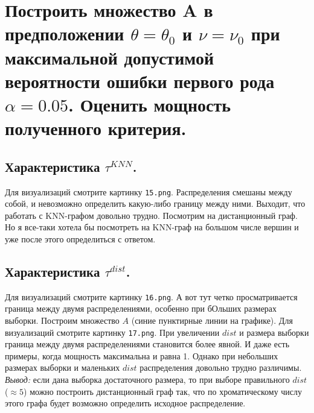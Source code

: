 \documentclass{report}
\begin{document}
\chapter{Построить множество A в предположении $\theta = \theta_0$ и $\nu = \nu_0$ при максимальной допустимой вероятности ошибки первого рода $\alpha = 0.05$. Оценить мощность полученного критерия.}
\section{Характеристика $\tau^{KNN}$.}
Для визуализаций смотрите картинку \texttt{15.png}.
\newline
\newline
Распределения смешаны между собой, и невозможно определить какую-либо границу между ними. Выходит, что работать с KNN-графом довольно трудно. Посмотрим на дистанционный граф. 
\newline
\newline
Но я все-таки хотела бы посмотреть на KNN-граф на большом числе вершин и уже после этого определиться с ответом.

\section{Характеристика $\tau^{dist}$.}
Для визуализаций смотрите картинку \texttt{16.png}.
\newline
\newline
А вот тут четко просматривается граница между двумя распределениями, особенно при бОльших размерах выборки. Построим множество $A$ (синие пунктирные линии на графике).
\newline
\newline
Для визуализаций смотрите картинку \texttt{17.png}.
\newline
\newline
При увеличении $dist$ и размера выборки граница между двумя распределениями становится более явной. И даже есть примеры, когда мощность максимальна и равна 1.
Однако при небольших размерах выборки и маленьких $dist$ распределения довольно трудно различимы.
\newline
\newline
\emph{Вывод:} если дана выборка достаточного размера, то при выборе правильного $dist$ ($\approx 5$) можно построить дистанционный граф так, что по хроматическому числу этого графа будет возможно определить исходное распределение.
\end{document}
